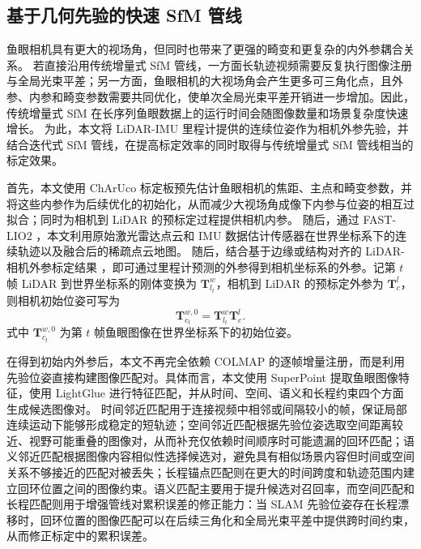 \subsection{基于几何先验的快速 SfM 管线}
\label{sec:method-fast-sfm}

鱼眼相机具有更大的视场角，但同时也带来了更强的畸变和更复杂的内外参耦合关系。
若直接沿用传统增量式 SfM 管线，一方面长轨迹视频需要反复执行图像注册与全局光束平差；另一方面，鱼眼相机的大视场角会产生更多可三角化点，且外参、内参和畸变参数需要共同优化，使单次全局光束平差开销进一步增加。因此，传统增量式 SfM 在长序列鱼眼数据上的运行时间会随图像数量和场景复杂度快速增长。
为此，本文将 LiDAR-IMU 里程计提供的连续位姿作为相机外参先验，并结合迭代式 SfM 管线，在提高标定效率的同时取得与传统增量式 SfM 管线相当的标定效果。

首先，本文使用 ChArUco 标定板预先估计鱼眼相机的焦距、主点和畸变参数，并将这些内参作为后续优化的初始化，从而减少大视场角成像下内参与位姿的相互过拟合；同时为相机到 LiDAR 的预标定过程提供相机内参。
随后，通过 FAST-LIO2 \cite{xu2022fastlio2}，本文利用原始激光雷达点云和 IMU 数据估计传感器在世界坐标系下的连续轨迹以及融合后的稀疏点云地图。
随后，结合基于边缘或结构对齐的 LiDAR-相机外参标定结果 \cite{yuan2021pixel}，即可通过里程计预测的外参得到相机坐标系的外参。记第 \(t\) 帧 LiDAR 到世界坐标系的刚体变换为 \(\mathbf{T}_{l_t}^{w}\)，相机到 LiDAR 的预标定外参为 \(\mathbf{T}_{c}^{l}\)，则相机初始位姿可写为
\begin{equation}
    \label{equ:method-camera-prior}
    \mathbf{T}_{c_t}^{w,0} = \mathbf{T}_{l_t}^{w}\mathbf{T}_{c}^{l}.
\end{equation}
式中 \(\mathbf{T}_{c_t}^{w,0}\) 为第 \(t\) 帧鱼眼图像在世界坐标系下的初始位姿。

在得到初始内外参后，本文不再完全依赖 COLMAP 的逐帧增量注册，而是利用先验位姿直接构建图像匹配对。具体而言，本文使用 SuperPoint \cite{detone2018superpoint} 提取鱼眼图像特征，使用 LightGlue \cite{lindenberger2023lightglue} 进行特征匹配，并从时间、空间、语义和长程约束四个方面生成候选图像对。
时间邻近匹配用于连接视频中相邻或间隔较小的帧，保证局部连续运动下能够形成稳定的短轨迹；空间邻近匹配根据先验位姿选取空间距离较近、视野可能重叠的图像对，从而补充仅依赖时间顺序时可能遗漏的回环匹配；语义邻近匹配根据图像内容相似性选择候选对，避免具有相似场景内容但时间或空间关系不够接近的匹配对被丢失；长程锚点匹配则在更大的时间跨度和轨迹范围内建立回环位置之间的图像约束。语义匹配主要用于提升候选对召回率，而空间匹配和长程匹配则用于增强管线对累积误差的修正能力：当 SLAM 先验位姿存在长程漂移时，回环位置的图像匹配可以在后续三角化和全局光束平差中提供跨时间约束，从而修正标定中的累积误差。

